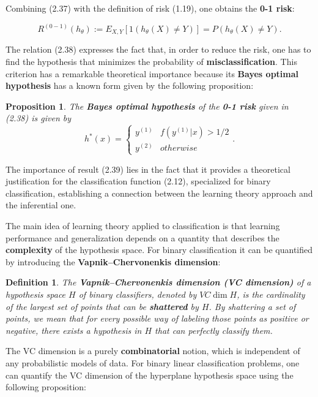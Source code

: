 \documentclass{report}
\newtheorem{definition}{Definition}[chapter]
\newtheorem{proposition}{Proposition}[chapter]
\begin{document}
Combining (2.37) with the definition of risk (1.19), one obtains the \textbf{0-1 risk}:

\begin{equation}
R^{(0-1)}(h_\theta) := E_{X,Y}[1(h_\theta(X) \neq Y)] = P(h_\theta(X) \neq Y).
\end{equation}

The relation (2.38) expresses the fact that, in order to reduce the risk, one has to find the hypothesis that minimizes the probability of \textbf{misclassification}. This criterion has a remarkable theoretical importance because its \textbf{Bayes optimal hypothesis} has a known form given by the following proposition:

\begin{proposition}
The \textbf{Bayes optimal hypothesis} of the \textbf{0-1 risk} given in (2.38) is given by
\begin{equation}
 h^*(x) = \left\{\begin{matrix}
y^{(1)} & f(y^{(1)}|x) > 1/2\\
y^{(2)} & otherwise
\end{matrix}\right..
\end{equation}
\end{proposition}

The importance of result (2.39) lies in the fact that it provides a theoretical justification for the classification function (2.12), specialized for binary classification, establishing a connection between the learning theory approach and the inferential one.

The main idea of learning theory applied to classification is that learning performance and generalization depends on a quantity that describes the \textbf{complexity} of the hypothesis space.
For binary classification it can be quantified by introducing the \textbf{Vapnik–Chervonenkis dimension}:

\begin{definition}
The \textbf{Vapnik–Chervonenkis dimension (VC dimension)} of a hypothesis space $H$ of binary classifiers, denoted by $VC\dim H$, is the cardinality of the largest set of points that can be \textbf{shattered} by $H$. By shattering a set of points, we mean that for every possible way of labeling those points as positive or negative, there exists a hypothesis in $H$ that can perfectly classify them.
\end{definition}

The VC dimension is a purely \textbf{combinatorial} notion, which is independent of any probabilistic models of data. For binary linear classification problems, one can quantify the VC dimension of the hyperplane hypothesis space using the following proposition:
\end{document}

